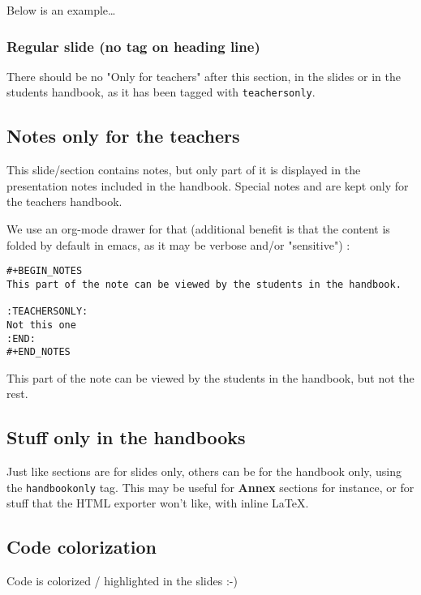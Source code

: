 \documentclass[a4paper]{article}
\begin{document}
Below is an example\ldots{}

\subsubsection{Regular slide (no tag on heading line)}
\label{sec:org61b9772}

There should be no "Only for teachers" after this section, in the slides or in the
students handbook, as it has been tagged with \texttt{teachersonly}.

\subsection{Notes only for the teachers}
\label{sec:org4436041}

This slide/section contains notes, but only part of it is displayed in
the presentation notes included in the handbook. Special notes and are
kept only for the teachers handbook.

We use an org-mode drawer for that (additional benefit is that the content is folded by default in emacs, as it may be verbose and/or "sensitive") :
\begin{verbatim}
#+BEGIN_NOTES
This part of the note can be viewed by the students in the handbook.

:TEACHERSONLY:
Not this one
:END:
#+END_NOTES
\end{verbatim}

\begin{NOTES}


This part of the note can be viewed by the students in the handbook,
but not the rest.
\end{NOTES}

\subsection{Stuff only in the handbooks}
\label{sec:org523efb7}

Just like sections are for slides only, others can be for the handbook
only, using the \texttt{handbookonly} tag. This may be useful for \textbf{Annex}
sections for instance, or for stuff that the HTML exporter won't like, with inline \LaTeX{}.

\subsection{Code colorization}
\label{sec:org59ace95}
Code is colorized / highlighted in the slides :-)
\end{document}
